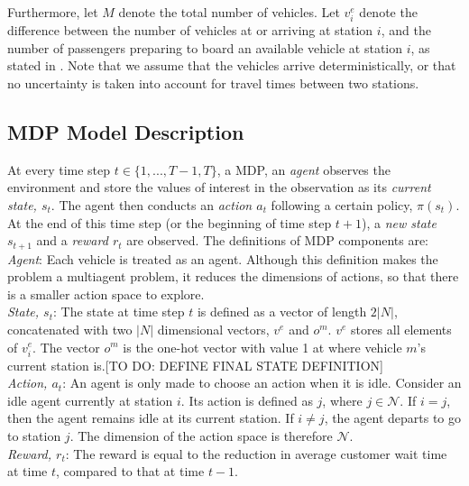 \documentclass[letterpaper, 10 pt, conference]{ieeeconf}  %
\begin{document}
Furthermore, let $M$ denote the total number of vehicles. Let $v^e_i$ denote the difference between the number of vehicles at or arriving at station $i$, and the number of passengers preparing to board an available vehicle at station $i$, as stated in \cite{Zhang.ea:Reactive}. Note that we assume that the vehicles arrive deterministically, or that no uncertainty is taken into account for travel times between two stations. 

\subsection{MDP Model Description}
At every time step $t \in \{1,...,T-1,T\}$, a MDP, an \textit{agent} observes the environment and store the values of interest in the observation as its \textit{current state, $s_t$}. The agent then conducts an \textit{action $a_t$} following a certain policy, $\pi(s_t)$. At the end of this time step (or the beginning of time step $t+1$), a \textit{new state $s_{t+1}$} and a \textit{reward $r_t$} are observed. The definitions of MDP components are:\\

\noindent \textit{Agent}: Each vehicle is treated as an agent. Although this definition makes the problem a multiagent problem, it reduces the dimensions of actions, so that there is a smaller action space to explore. \\

\noindent \textit{State, $s_t$}: The state at time step $t$ is defined as a vector of length $2|N|$, concatenated with two $|N|$ dimensional vectors, $v^e$ and $o^m$. $v^e$ stores all elements of $v^e_i$. The vector $o^m$ is the one-hot vector with value 1 at where vehicle $m$'s current station is.[TO DO: DEFINE FINAL STATE DEFINITION] \\

\noindent \textit{Action, $a_t$}: An agent is only made to choose an action when it is idle. Consider an idle agent currently at station $i$. Its action is defined as $j$, where $j\in \mathcal{N}$. If $i = j$, then the agent remains idle at its current station. If $i \neq j$, the agent departs to go to station $j$. The dimension of the action space is therefore $\mathcal{N}$. \\

\noindent \textit{Reward, $r_t$}: The reward is equal to the reduction in average customer wait time at time $t$, compared to that at time $t-1$. \\ 
\end{document}
